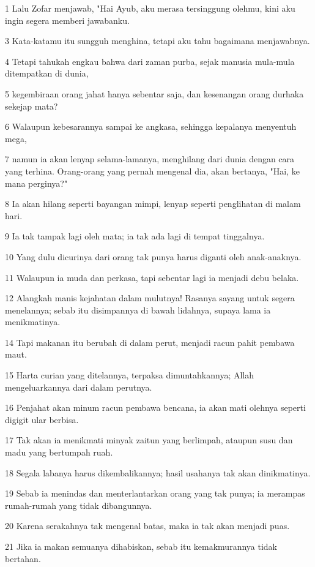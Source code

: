 \par 1 Lalu Zofar menjawab, "Hai Ayub, aku merasa tersinggung olehmu, kini aku ingin segera memberi jawabanku.
\par 3 Kata-katamu itu sungguh menghina, tetapi aku tahu bagaimana menjawabnya.
\par 4 Tetapi tahukah engkau bahwa dari zaman purba, sejak manusia mula-mula ditempatkan di dunia,
\par 5 kegembiraan orang jahat hanya sebentar saja, dan kesenangan orang durhaka sekejap mata?
\par 6 Walaupun kebesarannya sampai ke angkasa, sehingga kepalanya menyentuh mega,
\par 7 namun ia akan lenyap selama-lamanya, menghilang dari dunia dengan cara yang terhina. Orang-orang yang pernah mengenal dia, akan bertanya, "Hai, ke mana perginya?"
\par 8 Ia akan hilang seperti bayangan mimpi, lenyap seperti penglihatan di malam hari.
\par 9 Ia tak tampak lagi oleh mata; ia tak ada lagi di tempat tinggalnya.
\par 10 Yang dulu dicurinya dari orang tak punya harus diganti oleh anak-anaknya.
\par 11 Walaupun ia muda dan perkasa, tapi sebentar lagi ia menjadi debu belaka.
\par 12 Alangkah manis kejahatan dalam mulutnya! Rasanya sayang untuk segera menelannya; sebab itu disimpannya di bawah lidahnya, supaya lama ia menikmatinya.
\par 14 Tapi makanan itu berubah di dalam perut, menjadi racun pahit pembawa maut.
\par 15 Harta curian yang ditelannya, terpaksa dimuntahkannya; Allah mengeluarkannya dari dalam perutnya.
\par 16 Penjahat akan minum racun pembawa bencana, ia akan mati olehnya seperti digigit ular berbisa.
\par 17 Tak akan ia menikmati minyak zaitun yang berlimpah, ataupun susu dan madu yang bertumpah ruah.
\par 18 Segala labanya harus dikembalikannya; hasil usahanya tak akan dinikmatinya.
\par 19 Sebab ia menindas dan menterlantarkan orang yang tak punya; ia merampas rumah-rumah yang tidak dibangunnya.
\par 20 Karena serakahnya tak mengenal batas, maka ia tak akan menjadi puas.
\par 21 Jika ia makan semuanya dihabiskan, sebab itu kemakmurannya tidak bertahan.
